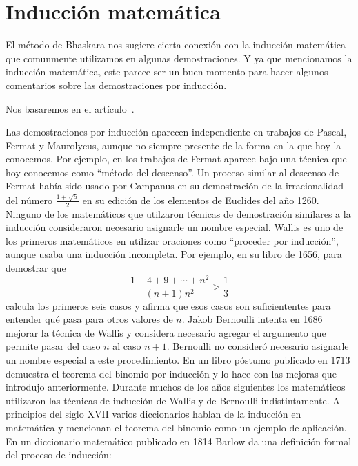 \section*{Inducción matemática}

El método de Bhaskara nos sugiere cierta conexión con la inducción matemática
que comunmente utilizamos en algunas demostraciones.  Y ya que mencionamos la
inducción matemática, este parece ser un buen momento para hacer algunos
comentarios sobre las demostraciones por inducción. 

Nos basaremos en el
artículo~\cite{MR1519060}. 

Las demostraciones por inducción aparecen
independiente en trabajos de Pascal, Fermat y Maurolycus, aunque no siempre
presente de la forma en la que hoy la conocemos. Por ejemplo, en los trabajos
de Fermat aparece bajo una técnica que hoy conocemos como ``método del descenso''. 
Un proceso similar al descenso de Fermat había sido usado por Campanus en su
demostración de la irracionalidad del número $\frac{1+\sqrt{5}}{2}$ en su
edición de los elementos de Euclides del año 1260. Ninguno de los matemáticos
que utilzaron técnicas de demostración similares a la inducción consideraron
necesario asignarle un nombre especial. Wallis es uno de los primeros
matemáticos en utilizar oraciones como ``proceder por inducción'', aunque usaba
una inducción incompleta. Por ejemplo, en su libro de 1656, para demostrar que
\[
	\frac{1+4+9+\cdots+n^2}{(n+1)n^2}>\frac13
\]
calcula los primeros seis casos y afirma que esos casos son suficiententes para
entender qué pasa para otros valores de $n$. Jakob Bernoulli intenta en 1686
mejorar la técnica de Wallis y considera necesario agregar el argumento que
permite pasar del caso $n$ al caso $n+1$. Bernoulli no consideró necesario
asignarle un nombre especial a este procedimiento. En un libro póstumo
publicado en 1713 demuestra el teorema del binomio por inducción y lo hace con
las mejoras que introdujo anteriormente. Durante muchos de los años siguientes
los matemáticos utilizaron las técnicas de inducción de Wallis y de Bernoulli
indistintamente. A principios del siglo XVII varios diccionarios hablan de la
inducción en matemática y mencionan el teorema del binomio como un ejemplo de
aplicación.  En un diccionario matemático publicado en 1814 Barlow da una
definición formal del proceso de inducción:
